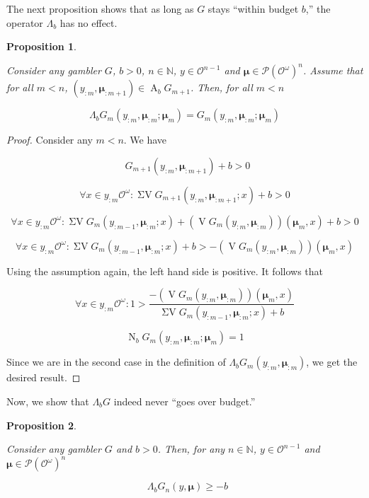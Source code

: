 \documentclass[11pt]{article}
\theoremstyle{definition}
\theoremstyle{plain}
\newtheorem{proposition}{Proposition}%
\newcommand{\Nats}{\mathbb{N}}
\newcommand{\PM}{\mathcal{P}}
\newcommand{\Ob}{\mathcal{O}}
\newcommand{\OO}{\Ob^\omega}
\newcommand{\PMO}{\PM(\OO)}
\DeclareMathOperator{\V}{V}
\DeclareMathOperator{\SV}{\Sigma V}
\DeclareMathOperator{\SVM}{\Sigma V_{\min}}
\DeclareMathOperator{\Ab}{A}
\DeclareMathOperator{\Nr}{N}
\newcommand{\Bd}{\Lambda}
\newcommand{\BM}{\bm{\mu}}
\begin{document}
The next proposition shows that as long as $G$ stays \enquote{within budget $b$,} the operator $\Bd_b$ has no effect. 

\begin{proposition}
\label{prp:b_no_effect}

Consider any gambler $G$, $b > 0$, $n \in \Nats$, $y \in \Ob^{n - 1}$ and $\BM \in \PMO^n$. Assume that for all $m < n$, $\left(y_{:m},\BM_{:m+1}\right) \in \Ab_b G_{m+1}$. Then, for all $m < n$

\begin{equation}
\Bd_b G_m\left(y_{:m},\BM_{:m};\BM_m\right)=G_m\left(y_{:m},\BM_{:m};\BM_m\right)
\end{equation}

\end{proposition}

\begin{proof}

Consider any $m < n$. We have

$$\SVM G_{m+1}\left(y_{:m},\BM_{:m+1}\right) + b > 0$$

$$\forall x \in y_{:m}\OO: \SV G_{m+1}\left(y_{:m},\BM_{:m+1}; x\right) + b > 0$$

$$\forall x \in y_{:m}\OO: \SV G_{m}\left(y_{:m-1},\BM_{:m}; x\right) + \left(\V G_{m}\left(y_{:m},\BM_{:m}\right)\right)\left(\BM_{m}, x\right) + b > 0$$

$$\forall x \in y_{:m}\OO: \SV G_{m}\left(y_{:m-1},\BM_{:m}; x\right) + b > -\left(\V G_{m}\left(y_{:m},\BM_{:m}\right)\right)\left(\BM_{m}, x\right)$$

Using the assumption again, the left hand side is positive. It follows that

$$\forall x \in y_{:m}\OO: 1 > \frac{-\left(\V G_{m}\left(y_{:m},\BM_{:m}\right)\right)\left(\BM_{m}, x\right)}{\SV G_{m}\left(y_{:m-1},\BM_{:m}; x\right) + b}$$

$$\Nr_b G_m\left(y_{:m},\BM_{:m};\BM_m\right) = 1$$

Since we are in the second case in the definition of ${\Bd_b G_m\left(y_{:m},\BM_{:m}\right)}$, we get the desired result.
\end{proof}

Now, we show that $\Bd_b G$ indeed never \enquote{goes over budget.}

\begin{proposition}
\label{prp:b_stays_in_budget}

Consider any gambler $G$ and $b > 0$. Then, for any $n \in \Nats$, $y \in \Ob^{n-1}$ and $\BM \in \PMO^n$

\begin{equation}
\SVM \Bd_b G_n\left(y,\BM\right) \geq -b
\end{equation} 

\end{proposition}
\end{document}
